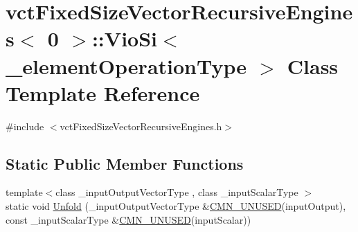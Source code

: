 \hypertarget{classvct_fixed_size_vector_recursive_engines_3_010_01_4_1_1_vio_si}{\section{vct\-Fixed\-Size\-Vector\-Recursive\-Engines$<$ 0 $>$\-:\-:Vio\-Si$<$ \-\_\-element\-Operation\-Type $>$ Class Template Reference}
\label{classvct_fixed_size_vector_recursive_engines_3_010_01_4_1_1_vio_si}
}


{\ttfamily \#include $<$vct\-Fixed\-Size\-Vector\-Recursive\-Engines.\-h$>$}

\subsection*{Static Public Member Functions}
\begin{DoxyCompactItemize}
\item 
{\footnotesize template$<$class \-\_\-input\-Output\-Vector\-Type , class \-\_\-input\-Scalar\-Type $>$ }\\static void \hyperlink{classvct_fixed_size_vector_recursive_engines_3_010_01_4_1_1_vio_si_a7ffb20fd0fc73180bb087799959225c2}{Unfold} (\-\_\-input\-Output\-Vector\-Type \&\hyperlink{cmn_portability_8h_a021894e2626935fa2305434b1e893ff6}{C\-M\-N\-\_\-\-U\-N\-U\-S\-E\-D}(input\-Output), const \-\_\-input\-Scalar\-Type \&\hyperlink{cmn_portability_8h_a021894e2626935fa2305434b1e893ff6}{C\-M\-N\-\_\-\-U\-N\-U\-S\-E\-D}(input\-Scalar))
\end{DoxyCompactItemize}


